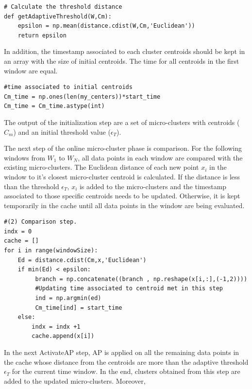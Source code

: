 \documentclass[../UNBThesis2.tex]{subfiles}
\begin{document}
\begin{lstlisting}
# Calculate the threshold distance
def getAdaptiveThreshold(W,Cm):
    epsilon = np.mean(distance.cdist(W,Cm,'Euclidean'))
    return epsilon
\end{lstlisting}

In addition, the timestamp associated to each cluster centroids should be kept in an array with the size of initial centroids. The time for all centroids in the first window are equal.

\begin{lstlisting}
#time associated to initial centroids
Cm_time = np.ones(len(my_centers))*start_time
Cm_time = Cm_time.astype(int)
\end{lstlisting}


The output of the initialization step are a set of micro-clusters with centroids ($C_m$) and an initial threshold value ($\epsilon_T$).

The next step of the online micro-cluster phase is comparison. For the following windows from $W_1$ to $W_N$, all data points in each window are compared with the existing micro-clusters. The Euclidean distance of each new point $x_i$ in the window to it's closest micro-cluster centroid is calculated. If the distance is less than the threshold $\epsilon_T$, $x_i$ is added to the micro-clusters and the timestamp associated to those specific centroids needs to be updated. Otherwise, it is kept temporarily in the cache until all data points in the window are being evaluated. 

\begin{lstlisting}
#(2) Comparison step. 
indx = 0
cache = []
for i in range(windowSize):
    Ed = distance.cdist(Cm,x,'Euclidean')     
    if min(Ed) < epsilon:
         branch = np.concatenate((branch , np.reshape(x[i,:],(-1,2)))) 
         #Updating time associated to centroid met in this step
         ind = np.argmin(ed)          
         Cm_time[ind] = start_time
    else:
        indx = indx +1
        cache.append(x[i])       

\end{lstlisting}


In the next ActivateAP step, AP is applied on all the remaining data points in the cache whose distance from the centroids are more than the adaptive threshold $\epsilon_T$ for the current time window. In the end, clusters obtained from this step are added to the updated micro-clusters. Moreover, 
\end{document}
